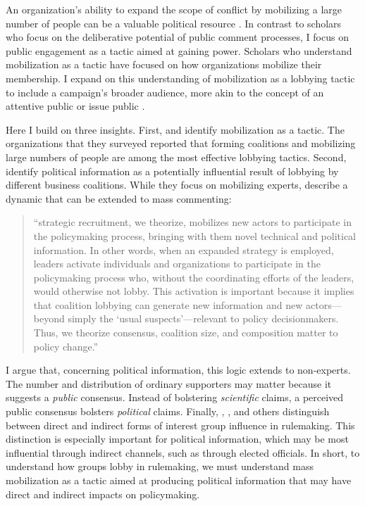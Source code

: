 \documentclass[
      12pt,
        ]{article}
\begin{document}
An organization's ability to expand the scope of conflict by mobilizing
a large number of people can be a valuable political resource \citep{Schattschneider1975}. In contrast to scholars who focus on the deliberative
potential of public comment processes, I focus on public engagement as a
tactic aimed at gaining power. Scholars who understand mobilization
as a tactic \citep{Furlong1997, Kerwin2011} have focused on how
organizations mobilize their membership. I expand on this understanding of mobilization as a lobbying tactic to include a campaign's broader audience, more akin to the concept of
an attentive public \citep{Key1961} or issue public \citep{Converse1964}.

Here I build on three insights. First, \citet{Furlong1997} and \citet{Kerwin2011}
identify mobilization as a tactic. The organizations that they surveyed
reported that forming coalitions and mobilizing large numbers of people
are among the most effective lobbying tactics. Second, \citet{Nelson2012}
identify political information as a potentially influential result of
lobbying by different business coalitions. While they focus on
mobilizing experts, \citet{Nelson2012} describe a dynamic that can be extended
to mass commenting:

\begin{quote}
``strategic recruitment, we theorize, mobilizes new actors to
participate in the policymaking process, bringing with them novel
technical and political information. In other words, when an expanded
strategy is employed, leaders activate individuals and organizations
to participate in the policymaking process who, without the
coordinating efforts of the leaders, would otherwise not lobby. This
activation is important because it implies that coalition lobbying can
generate new information and new actors---beyond simply the `usual
suspects'---relevant to policy decisionmakers. Thus, we theorize
consensus, coalition size, and composition matter to policy change.''
\end{quote}

I argue that, concerning political information, this logic extends to
non-experts. The number and distribution of ordinary supporters may
matter because it suggests a \emph{public} consensus. Instead of bolstering
\emph{scientific} claims, a perceived public consensus bolsters \emph{political}
claims. Finally, \citet{Furlong1998}, \citet{Yackee2006JPART}, and others distinguish
between direct and indirect forms of interest group influence in
rulemaking. This distinction is especially important for political
information, which may be most influential through indirect channels,
such as through elected officials. In short, to understand how groups
lobby in rulemaking, we must understand mass mobilization as a tactic
aimed at producing political information that may have direct and
indirect impacts on policymaking.
\end{document}
